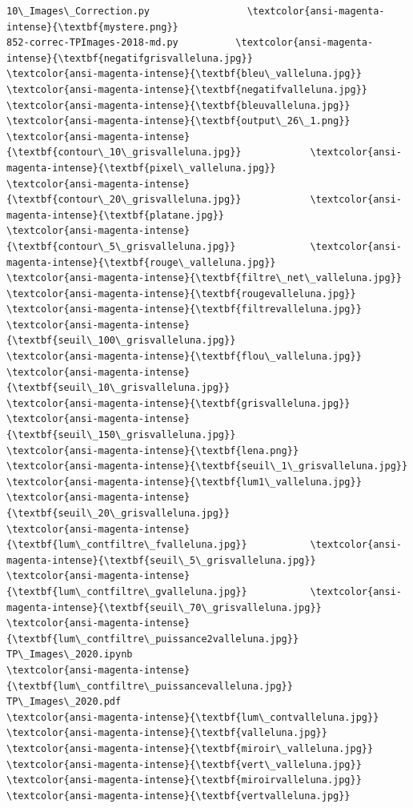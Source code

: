 \documentclass[11pt]{article}
\begin{document}
    \begin{Verbatim}[commandchars=\\\{\}]
10\_Images\_Correction.py                 \textcolor{ansi-magenta-intense}{\textbf{mystere.png}}
852-correc-TPImages-2018-md.py          \textcolor{ansi-magenta-intense}{\textbf{negatifgrisvalleluna.jpg}}
\textcolor{ansi-magenta-intense}{\textbf{bleu\_valleluna.jpg}}                      \textcolor{ansi-magenta-intense}{\textbf{negatifvalleluna.jpg}}
\textcolor{ansi-magenta-intense}{\textbf{bleuvalleluna.jpg}}                       \textcolor{ansi-magenta-intense}{\textbf{output\_26\_1.png}}
\textcolor{ansi-magenta-intense}{\textbf{contour\_10\_grisvalleluna.jpg}}            \textcolor{ansi-magenta-intense}{\textbf{pixel\_valleluna.jpg}}
\textcolor{ansi-magenta-intense}{\textbf{contour\_20\_grisvalleluna.jpg}}            \textcolor{ansi-magenta-intense}{\textbf{platane.jpg}}
\textcolor{ansi-magenta-intense}{\textbf{contour\_5\_grisvalleluna.jpg}}             \textcolor{ansi-magenta-intense}{\textbf{rouge\_valleluna.jpg}}
\textcolor{ansi-magenta-intense}{\textbf{filtre\_net\_valleluna.jpg}}                \textcolor{ansi-magenta-intense}{\textbf{rougevalleluna.jpg}}
\textcolor{ansi-magenta-intense}{\textbf{filtrevalleluna.jpg}}                     \textcolor{ansi-magenta-intense}{\textbf{seuil\_100\_grisvalleluna.jpg}}
\textcolor{ansi-magenta-intense}{\textbf{flou\_valleluna.jpg}}                      \textcolor{ansi-magenta-intense}{\textbf{seuil\_10\_grisvalleluna.jpg}}
\textcolor{ansi-magenta-intense}{\textbf{grisvalleluna.jpg}}                       \textcolor{ansi-magenta-intense}{\textbf{seuil\_150\_grisvalleluna.jpg}}
\textcolor{ansi-magenta-intense}{\textbf{lena.png}}                                \textcolor{ansi-magenta-intense}{\textbf{seuil\_1\_grisvalleluna.jpg}}
\textcolor{ansi-magenta-intense}{\textbf{lum1\_valleluna.jpg}}                      \textcolor{ansi-magenta-intense}{\textbf{seuil\_20\_grisvalleluna.jpg}}
\textcolor{ansi-magenta-intense}{\textbf{lum\_contfiltre\_fvalleluna.jpg}}           \textcolor{ansi-magenta-intense}{\textbf{seuil\_5\_grisvalleluna.jpg}}
\textcolor{ansi-magenta-intense}{\textbf{lum\_contfiltre\_gvalleluna.jpg}}           \textcolor{ansi-magenta-intense}{\textbf{seuil\_70\_grisvalleluna.jpg}}
\textcolor{ansi-magenta-intense}{\textbf{lum\_contfiltre\_puissance2valleluna.jpg}}  TP\_Images\_2020.ipynb
\textcolor{ansi-magenta-intense}{\textbf{lum\_contfiltre\_puissancevalleluna.jpg}}   TP\_Images\_2020.pdf
\textcolor{ansi-magenta-intense}{\textbf{lum\_contvalleluna.jpg}}                   \textcolor{ansi-magenta-intense}{\textbf{valleluna.jpg}}
\textcolor{ansi-magenta-intense}{\textbf{miroir\_valleluna.jpg}}                    \textcolor{ansi-magenta-intense}{\textbf{vert\_valleluna.jpg}}
\textcolor{ansi-magenta-intense}{\textbf{miroirvalleluna.jpg}}                     \textcolor{ansi-magenta-intense}{\textbf{vertvalleluna.jpg}}

    \end{Verbatim}
\end{document}

